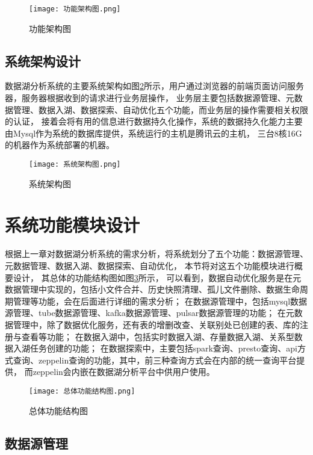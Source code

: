 \begin{figure}[H]
  \centering
  \texttt{[image: 功能架构图.png]}
  \caption{功能架构图}
  \label{fig:功能架构图}
\end{figure}

\subsection{系统架构设计}

数据湖分析系统的主要系统架构如图\ref{fig:系统架构图}所示，用户通过浏览器的前端页面访问服务器，服务器根据收到的请求进行业务层操作，
业务层主要包括数据源管理、元数据管理、数据入湖、数据探索、自动优化五个功能，而业务层的操作需要相关权限的认证，
接着会将有用的信息进行数据持久化操作，系统的数据持久化能力主要由Mysql作为系统的数据库提供，系统运行的主机是腾讯云的主机，
三台8核16G的机器作为系统部署的机器。

\begin{figure}[H]
  \centering
  \texttt{[image: 系统架构图.png]}
  \caption{系统架构图}
  \label{fig:系统架构图}
\end{figure}

\section{系统功能模块设计}

根据上一章对数据湖分析系统的需求分析，将系统划分了五个功能：数据源管理、元数据管理、数据入湖、数据探索、自动优化，
本节将对这五个功能模块进行概要设计，
其总体的功能结构图如图\ref{fig:总体功能结构图}所示，
可以看到，数据自动优化服务是在元数据管理中实现的，包括小文件合并、历史快照清理、孤儿文件删除、数据生命周期管理等功能，会在后面进行详细的需求分析；
在数据源管理中，包括mysql数据源管理、tube数据源管理、kafka数据源管理、pulsar数据源管理的功能；
在元数据管理中，除了数据优化服务，还有表的增删改查、关联别处已创建的表、库的注册与查看等功能；
在数据入湖中，包括实时数据入湖、存量数据入湖、关系型数据入湖任务创建的功能；
在数据探索中，主要包括spark查询、presto查询、api方式查询、zeppelin查询的功能，其中，前三种查询方式会在内部的统一查询平台提供，
而zeppelin会内嵌在数据湖分析平台中供用户使用。

\begin{figure}[H]
  \centering
  \texttt{[image: 总体功能结构图.png]}
  \caption{总体功能结构图}
  \label{fig:总体功能结构图}
\end{figure}

\subsection{数据源管理}

